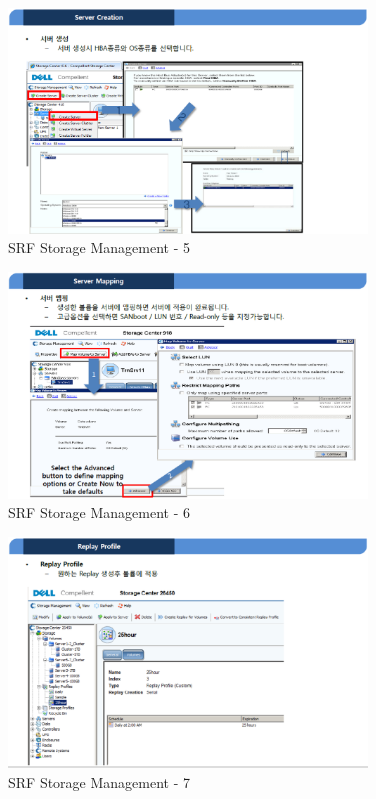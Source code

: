 \documentclass[11pt
  , a4paper
  , article
  , oneside
]{memoir}
\begin{document}
\begin{figure}[h!]
	\centering
	\includegraphics[width=0.85\textwidth]{./images/srfdb_storage_mana_5.eps}
	\caption{SRF Storage Management - 5}
	\label{fig:srfdb_mana_5} 
\end{figure}

\begin{figure}[h!]
	\centering
	\includegraphics[width=0.85\textwidth]{./images/srfdb_storage_mana_6.eps}
	\caption{SRF Storage Management - 6}
	\label{fig:srfdb_mana_6} 
\end{figure}

\begin{figure}[h!]
	\centering
	\includegraphics[width=0.85\textwidth]{./images/srfdb_storage_mana_7.eps}
	\caption{SRF Storage Management - 7}
	\label{fig:srfdb_mana_7} 
\end{figure}
\end{document}

